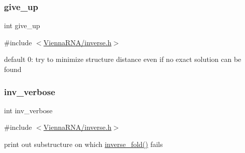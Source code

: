 \subsubsection{\texorpdfstring{give\+\_\+up}{give\_up}}
{\footnotesize\ttfamily int give\+\_\+up}



{\ttfamily \#include $<$\hyperlink{inverse_8h}{Vienna\+R\+N\+A/inverse.\+h}$>$}

default 0\+: try to minimize structure distance even if no exact solution can be found \mbox{\label{group__inverse__fold_gafcfc65fba01b9cca5946726ed9057a63}} 
\subsubsection{\texorpdfstring{inv\+\_\+verbose}{inv\_verbose}}
{\footnotesize\ttfamily int inv\+\_\+verbose}



{\ttfamily \#include $<$\hyperlink{inverse_8h}{Vienna\+R\+N\+A/inverse.\+h}$>$}

print out substructure on which \hyperlink{group__inverse__fold_ga7af026de55d4babad879f2c92559cbbc}{inverse\+\_\+fold()} fails 